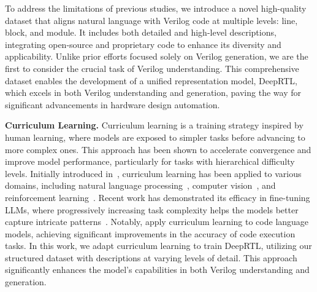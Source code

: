 To address the limitations of previous studies, we introduce a novel high-quality dataset that aligns natural language with Verilog code at multiple levels: line, block, and module. It includes both detailed and high-level descriptions, integrating open-source and proprietary code to enhance its diversity and applicability. Unlike prior efforts focused solely on Verilog generation, we are the first to consider the crucial task of Verilog understanding. This comprehensive dataset enables the development of a unified representation model, DeepRTL, which excels in both Verilog understanding and generation, paving the way for significant advancements in hardware design automation.

\textbf{Curriculum Learning.} Curriculum learning is a training strategy inspired by human learning, where models are exposed to simpler tasks before advancing to more complex ones. This approach has been shown to accelerate convergence and improve model performance, particularly for tasks with hierarchical difficulty levels. Initially introduced in~\citet{bengio2009curriculum}, curriculum learning has been applied to various domains, including natural language processing~\citep{xu2020curriculum}, computer vision~\citep{wang2023efficienttrain}, and reinforcement learning~\citep{narvekar2020curriculum}. Recent work has demonstrated its efficacy in fine-tuning LLMs, where progressively increasing task complexity helps the models better capture intricate patterns~\citep{campos2021curriculum}. Notably, \citet{na2024curriculum} apply curriculum learning to code language models, achieving significant improvements in the accuracy of code execution tasks. In this work, we adapt curriculum learning to train DeepRTL, utilizing our structured dataset with descriptions at varying levels of detail. This approach significantly enhances the model's capabilities in both Verilog understanding and generation.